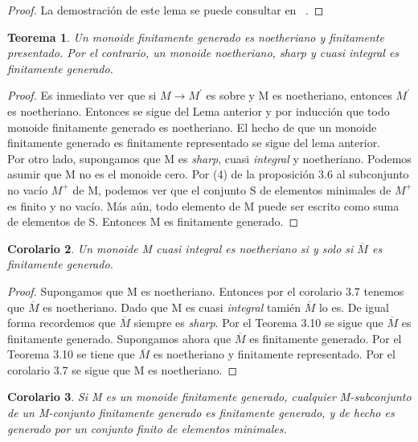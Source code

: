 \documentclass[12pt,spanish]{amsart}
\newtheorem{Theorem}{Teorema}[section]
\newtheorem{cor}[Theorem]{Corolario}
\theoremstyle{definition}
\theoremstyle{remark}
\begin{document}
\begin{proof}
La demostración de este lema se puede consultar en ~\cite{Ogus:2018aa}. 
\end{proof}

\begin{Theorem}
Un monoide finitamente generado es noetheriano y finitamente presentado. Por el contrario, un monoide noetheriano, \textit{sharp} y cuasi \textit{integral} es finitamente generado.   
\end{Theorem}

\begin{proof}
Es inmediato ver que si $M \to M^{\prime}$ es sobre y M es noetheriano, entonces $M^{\prime}$ es noetheriano. Entonces se sigue del Lema anterior y por inducción que todo monoide finitamente generado es noetheriano. El hecho de que un monoide finitamente generado es finitamente representado se sigue del lema anterior. \\
Por otro lado, supongamos que M es \textit{sharp}, cuasi \textit{integral} y noetheriano. Podemos asumir que M no es el monoide cero. Por (4) de la proposición 3.6 al subconjunto no vacío $M^{+}$ de M, podemos ver que el conjunto S de elementos minimales de $M^{+}$ es finito y no vacío. Más aún, todo elemento de M puede ser escrito como suma de elementos de S. Entonces M es finitamente generado. 
\end{proof}


\begin{cor}
Un monoide M cuasi \textit{integral} es noetheriano si y solo si $\overline{M}$ es finitamente generado. 
\end{cor}

\begin{proof}
Supongamos que M es noetheriano. Entonces por el corolario 3.7 tenemos que $\overline{M}$ es noetheriano. Dado que M es cuasi \textit{integral} tamién $\overline{M}$ lo es. De igual forma recordemos que $\overline{M}$ siempre es \textit{sharp}. Por el Teorema 3.10 se sigue que $\overline{M}$ es finitamente generado. Supongamos ahora que $\overline{M}$ es finitamente generado. Por el Teorema 3.10 se tiene que $\overline{M}$ es noetheriano y finitamente representado. Por el corolario 3.7 se sigue que M es noetheriano. 
\end{proof}

\begin{cor}
Si M es un monoide finitamente generado, cualquier M-subconjunto de un M-conjunto finitamente generado es finitamente generado, y de hecho es generado por un conjunto finito de elementos minimales. 
\end{cor}
\end{document}
